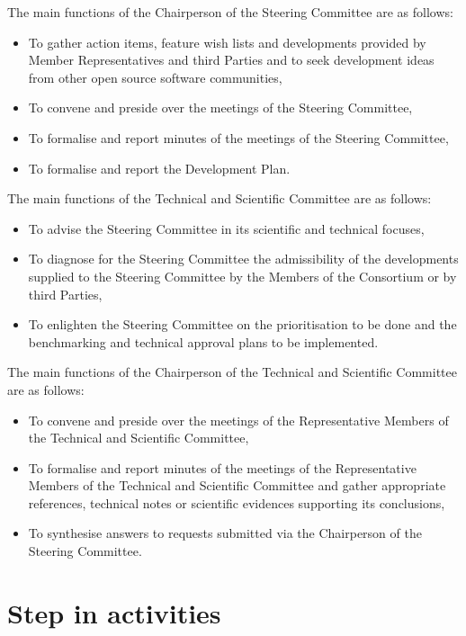 The main functions of the Chairperson of the Steering Committee are as follows:
\begin{itemize}
\item To gather action items, feature wish lists and developments provided by
Member Representatives and third Parties and to seek development ideas from
other open source software communities,
\item To convene and preside over the meetings of the Steering Committee,
\item To formalise and report minutes of the meetings of the Steering
Committee,
\item To formalise and report the Development Plan.
\end{itemize}

The main functions of the Technical and Scientific Committee are as follows:
\begin{itemize}
\item To advise the Steering Committee in its scientific and technical focuses,
\item To diagnose for the Steering Committee the admissibility of the
developments supplied to the Steering Committee by the Members of the
Consortium or by third Parties,
\item To enlighten the Steering Committee on the prioritisation to be done and
the benchmarking and technical approval plans to be implemented.
\end{itemize}

The main functions of the Chairperson of the Technical and Scientific Committee are as follows:
\begin{itemize}
\item To convene and preside over the meetings of the Representative Members of
the Technical and Scientific Committee,
\item To formalise and report minutes of the meetings of the Representative
Members of the Technical and Scientific Committee and gather appropriate
references, technical notes or scientific evidences supporting its conclusions,
\item To synthesise answers to requests submitted via the Chairperson of the
Steering Committee.
\end{itemize}

\section{Step in \telemacsystem activities}

